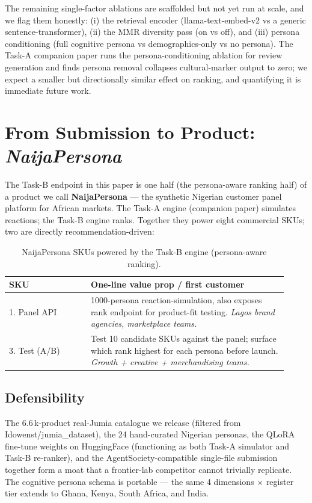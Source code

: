 \documentclass[sigconf,nonacm,balance]{acmart}
\begin{document}
The remaining single-factor ablations are scaffolded but not yet run at
scale, and we flag them honestly: (i) the retrieval encoder
(\textsf{llama-text-embed-v2} vs a generic sentence-transformer),
(ii) the MMR diversity pass (on vs off), and
(iii) persona conditioning (full cognitive persona vs demographics-only vs no
persona). The Task-A companion paper runs the persona-conditioning ablation
for review generation and finds persona removal collapses cultural-marker
output to zero; we expect a smaller but directionally similar effect on
ranking, and quantifying it is immediate future work.

\section{From Submission to Product: \emph{NaijaPersona}}
\label{sec:product}

The Task-B endpoint in this paper is one half (the persona-aware
ranking half) of a product we call \textbf{NaijaPersona} --- the
synthetic Nigerian customer panel platform for African markets. The
Task-A engine (companion paper) simulates reactions; the Task-B engine
ranks. Together they power eight commercial SKUs; two are directly
recommendation-driven:

\begin{table}[t]
\caption{NaijaPersona SKUs powered by the Task-B engine
         (persona-aware ranking).}
\label{tab:naijapersona-skus-b}
\small
\begin{tabular}{p{0.27\linewidth}p{0.65\linewidth}}
\toprule
\textbf{SKU} & \textbf{One-line value prop / first customer} \\
\midrule
1. Panel API & 1000-persona reaction-simulation, also exposes rank
                endpoint for product-fit testing.
                \emph{Lagos brand agencies, marketplace teams.} \\
3. Test (A/B) & Test 10 candidate SKUs against the panel; surface which
                rank highest for each persona before launch.
                \emph{Growth + creative + merchandising teams.} \\
\bottomrule
\end{tabular}
\end{table}

\subsection*{Defensibility}
The 6.6\,k-product real-Jumia catalogue we release (filtered from
\textsf{Idowenst/jumia\_dataset}), the 24 hand-curated Nigerian
personas, the QLoRA fine-tune weights on HuggingFace (functioning as
both Task-A simulator and Task-B re-ranker), and the
AgentSociety-compatible single-file submission together form a moat
that a frontier-lab competitor cannot trivially replicate. The cognitive
persona schema is portable --- the same 4 dimensions $\times$ register
tier extends to Ghana, Kenya, South Africa, and India.
\end{document}
